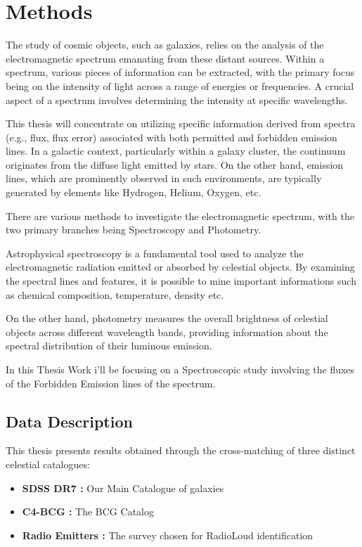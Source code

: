 \chapter{Methods}
The study of cosmic objects, such as galaxies, relies on the analysis of the electromagnetic spectrum emanating from these distant sources. Within a spectrum, various pieces of information can be extracted, with the primary focus being on the intensity of light across a range of energies or frequencies. A crucial aspect of a spectrum involves determining the intensity at specific wavelengths.

This thesis will concentrate on utilizing specific information derived from spectra (e.g., flux, flux error) associated with both permitted and forbidden emission lines. In a galactic context, particularly within a galaxy cluster, the continuum originates from the diffuse light emitted by stars. On the other hand, emission lines, which are prominently observed in such environments, are typically generated by elements like Hydrogen, Helium, Oxygen, etc.

There are various methods to investigate the electromagnetic spectrum, with the two primary branches being Spectroscopy and Photometry.

Astrophysical spectroscopy is a fundamental tool used to analyze the electromagnetic radiation emitted or absorbed by celestial objects. By examining the spectral lines and features, it is possible to mine important informations such as chemical composition, temperature, density etc.

On the other hand, photometry measures the overall brightness of celestial objects across different wavelength bands, providing information about the spectral distribution of their luminous emission. 

In this Thesis Work i'll be focusing on a Spectroscopic study involving the fluxes of the Forbidden Emission lines of the spectrum.

\section{Data Description}
This thesis presents results obtained through the cross-matching of three distinct celestial catalogues:
\begin{itemize}
	\item\textbf{SDSS DR7 :} Our Main Catalogue of galaxies
	\item \textbf{C4-BCG :} The BCG Catalog 
	\item \textbf{Radio Emitters :}  The survey chosen for RadioLoud identification
\end{itemize}

